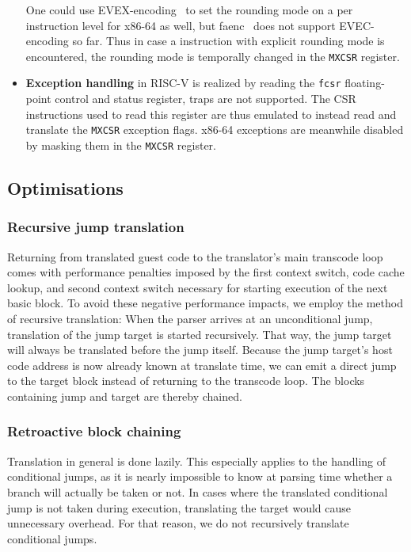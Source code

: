 \begin{itemize}
            One could use EVEX-encoding~\cite[S. 374]{intel2017man} to set the rounding mode on a per instruction level for x86-64 as well, but faenc~\cite{faenc} does not support EVEC-encoding so far.  %
            Thus in case a instruction with explicit rounding mode is encountered, the rounding mode is temporally changed in the \texttt{MXCSR} register.
    \item \textbf{Exception handling} in RISC-V is realized by reading the \texttt{fcsr} floating-point control and status register, traps are not supported.
            The CSR instructions used to read this register are thus emulated to instead read and translate the \texttt{MXCSR} exception flags.
            x86-64 exceptions are meanwhile disabled by masking them in the \texttt{MXCSR} register.
\end{itemize}


\subsection{Optimisations}
\label{sec:optimise}

\subsubsection{Recursive jump translation}
\label{sec:recursive_translation}
Returning from translated guest code to the translator's main transcode loop comes with performance penalties imposed by the first context switch, code cache lookup, and second context switch necessary for starting execution of the next basic block.
To avoid these negative performance impacts, we employ the method of recursive translation: When the parser arrives at an unconditional jump, translation of the jump target is started recursively.
That way, the jump target will always be translated before the jump itself.
Because the jump target's host code address is now already known at translate time, we can emit a direct jump to the target block instead of returning to the transcode loop.
The blocks containing jump and target are thereby chained.

\subsubsection{Retroactive block chaining}
\label{sec:chaining}
Translation in general is done lazily.
This especially applies to the handling of conditional jumps, as it is nearly impossible to know at parsing time whether a branch will actually be taken or not.
In cases where the translated conditional jump is not taken during execution, translating the target would cause unnecessary overhead.
For that reason, we do not recursively translate conditional jumps.

